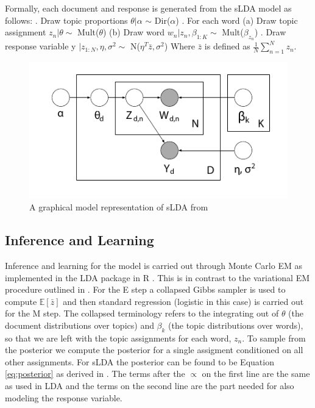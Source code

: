 \documentclass{article}
\begin{document}
Formally, each document and response is generated from the sLDA model as follows: . Draw topic proportions $\theta | \alpha$ $\sim$ Dir($\alpha$) . For each word \newline
  (a) Draw topic assignment $z_{n} | \theta \sim$ Mult($\theta$) \newline
  (b) Draw word $w_{n} | z_{n}, \beta_{1:K} \sim $ Mult($\beta_{z_{n}}$) . Draw response variable y $| z_{1:N}, \eta, \sigma^{2} \sim$ N($\eta^{T}\bar{z},\sigma^{2}$) \newline
Where $\bar{z}$ is defined as $\frac{1}{N} \sum_{n=1}^{N} z_{n}$.

\begin{figure}[h]
\centering
\includegraphics[scale = 1]{slda_graphic}
\caption{A graphical model representation of sLDA from \cite{mcauliffe}}
\label{fig_slda}
\end{figure}


\subsection{Inference and Learning}
Inference and learning for the model is carried out through Monte Carlo EM as implemented in the LDA package in R \cite{changR}. 
This is in contrast to the variational EM procedure outlined in \cite{mcauliffe}. For the E step a collapsed Gibbs sampler is
used to compute $\mathbb{E}[\bar{z}]$ and then standard regression (logistic in this case) is carried out for the M step. The 
collapsed terminology refers to the integrating out of $\theta$ (the document distributions over topics) and $\beta_{k}$ (the 
topic distributions over words), so that we are left with the topic assignments for each word, $z_n$. To sample from the 
posterior we compute the posterior for a single assigment conditioned on all other assignments. For sLDA the posterior can be 
found to be Equation \ref{eq:posterior} as derived in \cite{chang}. The terms after the $\propto$ on the first line are the same as used in LDA and the terms on the second line are the part needed for also modeling the response variable.
\end{document}

